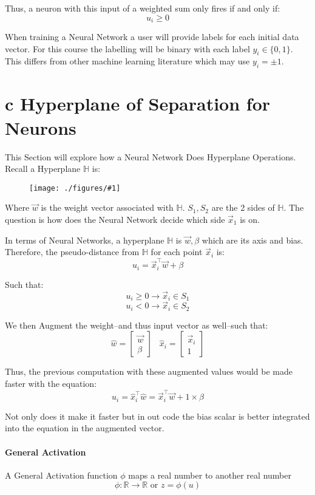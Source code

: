 \documentclass[12pt]{book}
\newcommand{\incimg}[2]{%
       \begin{figure}[h]
               \centering
               \texttt{[image: ./figures/\#1]}
       \end{figure}
}
\begin{document}
Thus, a neuron with this input of a weighted sum only fires if and 
only if:
\[u_i \geq 0\]

When training a Neural Network a user will provide labels for each 
initial data vector. For this course the labelling will be binary with 
each label $y_i \in \{0,1\}$. This differs from other machine 
learning literature which may use $y_i = \pm 1$. 


\section*{c Hyperplane of Separation for Neurons}
This Section will explore how a Neural Network Does Hyperplane Operations.
Recall a Hyperplane $\mathbb{H}$ is:
\incimg{hyperP}{0.5}

Where $\vec w$ is the weight vector associated with $\mathbb{H}$. $S_1, 
S_2$ are the 2 sides of $\mathbb{H}$. The question is how does the 
Neural Network decide which side $\vec x_1$ is on.

In terms of Neural Networks, a hyperplane $\mathbb{H}$ is 
$\vec w, \beta$ which are its axis and bias.
Therefore, the pseudo-distance 
from $\mathbb{H}$ for each point $\vec x_i$ 
is:
\[u_i = \vec x_i^\top \vec w + \beta\]

Such that: 
\[u_i \geq 0 \rightarrow \vec x_i \in S_1\]
\[u_i < 0 \rightarrow \vec x_i \in S_2\]

We then Augment the weight--and thus input vector as well--such that:
\[\hat w = \begin{bmatrix} \vec w\\\beta\end{bmatrix} \;\;\; \hat x_i = \begin{bmatrix} \vec x_i\\1\end{bmatrix}\]

Thus, the previous computation with these augmented values would be
made faster with the equation:
\[u_i = \hat x_i^\top \hat w  = \vec x_i^\top \vec w + 1 \times \beta\]
 
Not only does it make it faster but in out code the bias scalar is better
integrated into the equation in the augmented vector.

\paragraph{General Activation}
A General Activation function $\phi$ maps a real number to another
real number
\[\phi : \mathbb{R} \rightarrow \mathbb{R} \text{ or } z = \phi(u)\]
\end{document}
